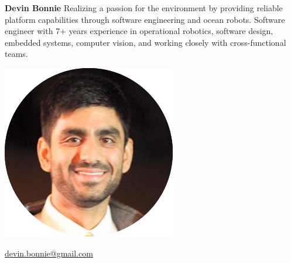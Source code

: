 \documentclass{article}
\begin{document}
    \renewcommand{\labelitemi}{\tiny$\bullet$} {
        \hspace{-12px}
        \begin{minipage}[t]{0.33\textwidth}
            \begin{flushleft}
                \noindent
                \hspace{-15px} \textbf{\fontsize{22}{0}\selectfont Devin Bonnie}
                \vspace{7px}
                \linebreak
                \noindent
                \small{Realizing a passion for the environment by providing reliable platform capabilities through software engineering and ocean robots. Software engineer with 7+ years experience in operational robotics, software design, embedded systems, computer vision, and working closely with cross-functional teams.}
                \vspace*{1\baselineskip}
            \end{flushleft}
        \end{minipage}
        \begin{minipage}[c]{0.33\textwidth}
            \begin{center}
                \includegraphics[trim= 0cm 8cm 0 0cm,scale=0.33]{dbCircle}
            \end{center}
        \end{minipage}
        \begin{minipage}[t]{0.33\textwidth}
            \begin{flushright}
                \vspace*{1.5\baselineskip}
                \href{mailto:devin.bonnie@gmail.com}{devin.bonnie@gmail.com}  \space\space \Letter

\end{flushright}
\end{minipage}}
\end{document}

